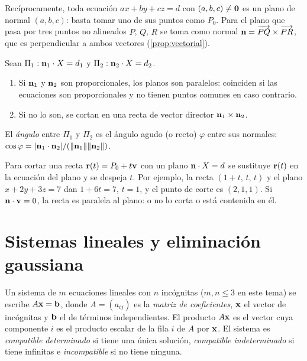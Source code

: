 Recíprocamente, toda ecuación $ax+by+cz=d$ con $(a,b,c)\neq\mathbf{0}$ es un plano de normal $(a,b,c)$: basta tomar uno de sus puntos como $P_0$. Para el plano que pasa por tres puntos no alineados $P$, $Q$, $R$ se toma como normal $\mathbf{n}=\overrightarrow{PQ}\times\overrightarrow{PR}$, que es perpendicular a ambos vectores (\cref{prop:vectorial}).

\addtocounter{definicion}{1}%

\begin{proposicion}\label{prop:dos-planos}
Sean $\Pi_1:\mathbf{n}_1\cdot X=d_1$ y $\Pi_2:\mathbf{n}_2\cdot X=d_2$.
\begin{enumerate}
  \item Si $\mathbf{n}_1$ y $\mathbf{n}_2$ son proporcionales, los planos son paralelos: coinciden si las ecuaciones son proporcionales y no tienen puntos comunes en caso contrario.
  \item Si no lo son, se cortan en una recta de vector director $\mathbf{n}_1\times\mathbf{n}_2$.
\end{enumerate}
El \emph{ángulo} entre $\Pi_1$ y $\Pi_2$ es el ángulo agudo (o recto) $\varphi$ entre sus normales: $\cos\varphi=\lvert\mathbf{n}_1\cdot\mathbf{n}_2\rvert/(\lVert\mathbf{n}_1\rVert\lVert\mathbf{n}_2\rVert)$.
\end{proposicion}

\addtocounter{definicion}{1}%

Para cortar una recta $\mathbf{r}(t)=P_0+t\mathbf{v}$ con un plano $\mathbf{n}\cdot X=d$ se sustituye $\mathbf{r}(t)$ en la ecuación del plano y se despeja $t$. Por ejemplo, la recta $(1+t,\,t,\,t)$ y el plano $x+2y+3z=7$ dan $1+6t=7$, $t=1$, y el punto de corte es $(2,1,1)$. Si $\mathbf{n}\cdot\mathbf{v}=0$, la recta es paralela al plano: o no lo corta o está contenida en él.

\section{Sistemas lineales y eliminación gaussiana}\label{sec:t2-gauss}

\begin{definicion}\label{def:sistema}
Un sistema de $m$ ecuaciones lineales con $n$ incógnitas ($m,n\le3$ en este tema) se escribe $A\mathbf{x}=\mathbf{b}$, donde $A=(a_{ij})$ es la \emph{matriz de coeficientes}, $\mathbf{x}$ el vector de incógnitas y $\mathbf{b}$ el de términos independientes. El producto $A\mathbf{x}$ es el vector cuya componente $i$ es el producto escalar de la fila $i$ de $A$ por $\mathbf{x}$. El sistema es \emph{compatible determinado} si tiene una única solución, \emph{compatible indeterminado} si tiene infinitas e \emph{incompatible} si no tiene ninguna.
\end{definicion}

